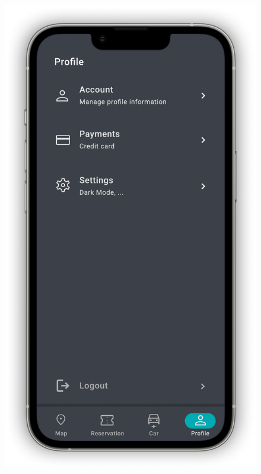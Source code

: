 \begin{figure}[H]
{        \includegraphics[scale=0.32,page=1]{src/mockups/profile.pdf}
    }
    \newline
\end{figure}

